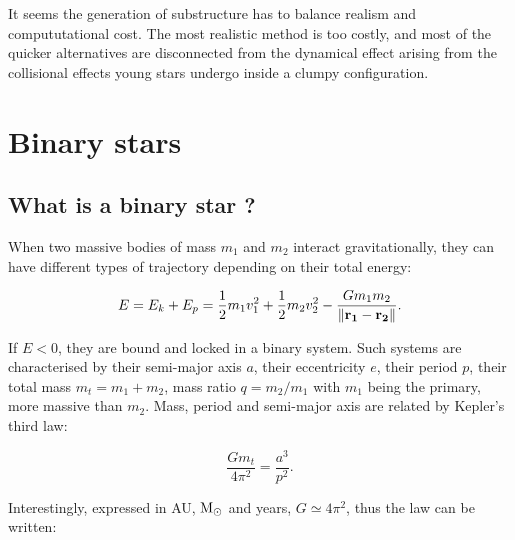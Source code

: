 It seems the generation of substructure has to balance realism and compututational cost. The most realistic method is too costly, and most of the quicker alternatives are disconnected from the dynamical effect arising from the collisional effects young stars undergo inside a clumpy configuration.



\section{Binary stars}

\subsection{What is a binary star ?}

When two massive bodies of mass $m_1$ and $m_2$ interact gravitationally, they can have different types of trajectory depending on their total energy:

\begin{equation}
E = E_k + E_p = \frac{1}{2} m_1 v_1^2 + \frac{1}{2} m_2 v_2^2  - \frac{G m_1 m_2}{\| \bold{r_1} - \bold{r_2}\| }.
\end{equation}


If $E<0$, they are bound and locked in a binary system. Such systems are characterised by their semi-major axis $a$, their eccentricity $e$, their period $p$, their total mass $m_t = m_1 + m_2$, mass ratio $q = m_2/m_1$ with $m_1$ being the primary, more massive than $m_2$.
Mass, period and semi-major axis are related by Kepler's third law:

\begin{equation}
\frac{G m_t}{4\pi^2} =  \frac{a^3}{p^2}.
\end{equation}

Interestingly, expressed in AU, ${\textrm{M}_\odot}$ and years, $G \simeq 4 \pi^2$, thus the law can be written:

